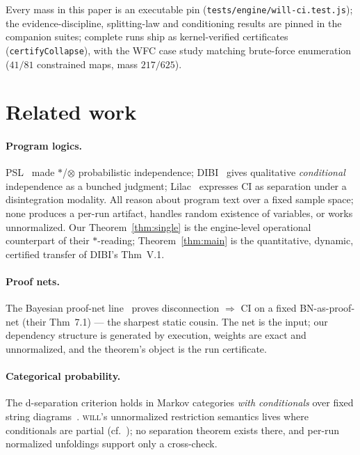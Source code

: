 \documentclass[11pt]{article}
\newcommand{\tensor}{\otimes}
\newcommand{\will}{\textsc{will}}
\theoremstyle{definition}
\theoremstyle{remark}
\begin{document}
Every mass in this paper is an executable pin
(\texttt{tests/engine/will-ci.test.js}); the evidence-discipline,
splitting-law and conditioning results are pinned in the companion
suites; complete runs ship as kernel-verified certificates
(\texttt{certifyCollapse}), with the WFC case study matching
brute-force enumeration ($41/81$ constrained maps, mass $217/625$).

\section{Related work}
\label{sec:related}

\paragraph{Program logics.}  PSL~\cite{BarthePSL2020} made
$\ast$/$\tensor$ probabilistic independence; DIBI~\cite{BaoDIBI2021}
gives qualitative \emph{conditional} independence as a bunched
judgment; Lilac~\cite{LilacPLDI2023} expresses CI as separation under
a disintegration modality.  All reason about program text over a fixed
sample space; none produces a per-run artifact, handles random
existence of variables, or works unnormalized.  Our
Theorem~\ref{thm:single} is the engine-level operational counterpart
of their $\ast$-reading; Theorem~\ref{thm:main} is the quantitative,
dynamic, certified transfer of DIBI's Thm~V.1.

\paragraph{Proof nets.}  The Bayesian proof-net
line~\cite{DiGuardiaEEF2026} proves disconnection $\Rightarrow$ CI on
a fixed BN-as-proof-net (their Thm~7.1) --- the sharpest static
cousin.  The net is the input; our dependency structure is generated
by execution, weights are exact and unnormalized, and the theorem's
object is the run certificate.

\paragraph{Categorical probability.}  The d-separation criterion holds
in Markov categories \emph{with conditionals} over fixed string
diagrams~\cite{FritzKlingler2023}.  \will{}'s unnormalized restriction
semantics lives where conditionals are partial
(cf.~\cite{DiLavoreRoman2023}); no separation theorem exists there,
and per-run normalized unfoldings support only a cross-check.
\end{document}
